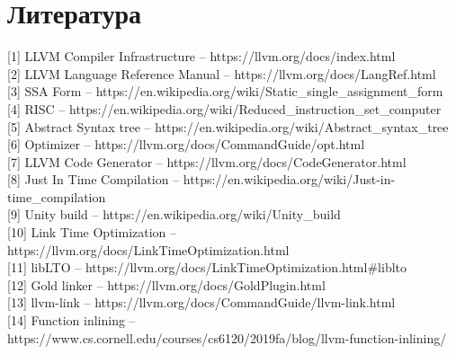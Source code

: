 \documentclass[12pt,oneside]{memoir}
\begin{document}
\backmatter
\chapter{Литература}
[1] LLVM Compiler Infrastructure -- https://llvm.org/docs/index.html \\

[2] LLVM Language Reference Manual -- https://llvm.org/docs/LangRef.html \\

[3] SSA Form -- https://en.wikipedia.org/wiki/Static{\_}single{\_}assignment{\_}form \\
 
[4] RISC -- https://en.wikipedia.org/wiki/Reduced{\_}instruction{\_}set{\_}computer \\

[5] Abstract Syntax tree -- https://en.wikipedia.org/wiki/Abstract{\_}syntax{\_}tree \\

[6] Optimizer -- https://llvm.org/docs/CommandGuide/opt.html \\

[7] LLVM Code Generator -- https://llvm.org/docs/CodeGenerator.html \\

[8] Just In Time Compilation  -- https://en.wikipedia.org/wiki/Just-in-time{\_}compilation \\

[9] Unity build -- https://en.wikipedia.org/wiki/Unity{\_}build \\ 

[10] Link Time Optimization -- https://llvm.org/docs/LinkTimeOptimization.html \\

[11] libLTO -- https://llvm.org/docs/LinkTimeOptimization.html{\#}liblto \\

[12] Gold linker -- https://llvm.org/docs/GoldPlugin.html \\

[13] llvm-link -- https://llvm.org/docs/CommandGuide/llvm-link.html \\

[14] Function inlining -- https://www.cs.cornell.edu/courses/cs6120/2019fa/blog/llvm-function-inlining/ \\
\end{document}

